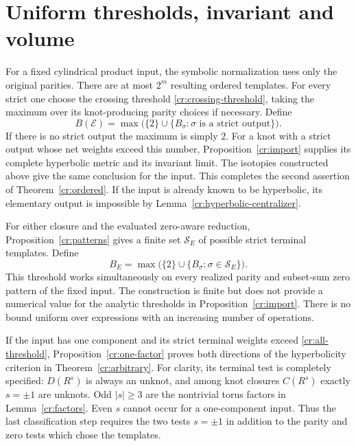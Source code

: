 \section{Uniform thresholds, invariant and volume}\label{cr:application}

For a fixed cylindrical product input, the symbolic normalization uses only the original parities. There are at most $2^m$ resulting ordered templates. For every strict one choose the crossing threshold \eqref{cr:crossing-threshold}, taking the maximum over its knot-producing parity choices if necessary. Define
\begin{equation}\label{cr:product-threshold}
 B(\mathcal E)=\max\bigl(\{2\}\cup
                \{B_\sigma:\sigma\text{ is a strict output}\}\bigr).
\end{equation}
If there is no strict output the maximum is simply $2$. For a knot with a strict output whose net weights exceed this number, Proposition~\ref{cr:import} supplies its complete hyperbolic metric and its invariant limit. The isotopies constructed above give the same conclusion for the input. This completes the second assertion of Theorem~\ref{cr:ordered}. If the input is already known to be hyperbolic, its elementary output is impossible by Lemma~\ref{cr:hyperbolic-centralizer}.

For either closure and the evaluated zero-aware reduction, Proposition~\ref{cr:patterns} gives a finite set $\mathcal S_E$ of possible strict terminal templates. Define
\begin{equation}\label{cr:all-threshold}
 B_E=\max\bigl(\{2\}\cup\{B_\sigma:\sigma\in\mathcal S_E\}\bigr).
\end{equation}
This threshold works simultaneously on every realized parity and subset-sum zero pattern of the fixed input. The construction is finite but does not provide a numerical value for the analytic thresholds in Proposition~\ref{cr:import}. There is no bound uniform over expressions with an increasing number of operations.

If the input has one component and its strict terminal weights exceed \eqref{cr:all-threshold}, Proposition~\ref{cr:one-factor} proves both directions of the hyperbolicity criterion in Theorem~\ref{cr:arbitrary}. For clarity, its terminal test is completely specified: $D(R^s)$ is always an unknot, and among knot closures $C(R^s)$ exactly $s=\pm1$ are unknots. Odd $|s|\ge3$ are the nontrivial torus factors in Lemma~\ref{cr:factors}. Even $s$ cannot occur for a one-component input. Thus the last classification step requires the two tests $s=\pm1$ in addition to the parity and zero tests which chose the templates.

